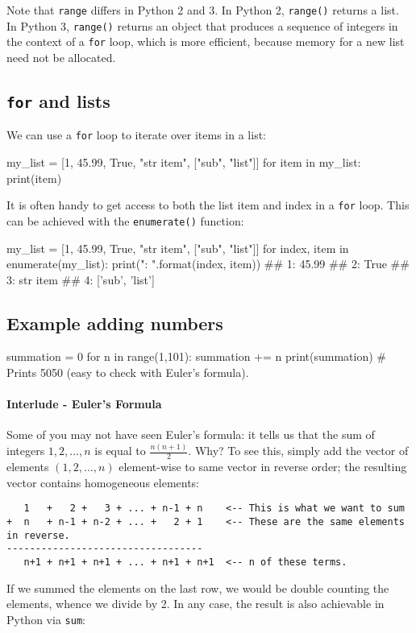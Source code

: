 \documentclass[12pt]{article} \newif\ifsolution\solutiontrue %
\begin{document}
Note that \texttt{range} differs in Python 2 and 3. In Python 2,
\texttt{range()} returns a list. In Python 3, \texttt{range()} returns
an object that produces a sequence of integers in the context of a
\texttt{for} loop, which is more efficient, because memory for a new
list need not be allocated.

\subsection{\texorpdfstring{\texttt{for} and
lists}{for and lists}}\label{for-and-lists}

We can use a \texttt{for} loop to iterate over items in a list:

\begin{python}
my_list = [1, 45.99, True, "str item", ["sub", "list"]]
for item in my_list:
    print(item)
\end{python}

It is often handy to get access to both the list item and index in a
\texttt{for} loop. This can be achieved with the \texttt{enumerate()}
function:

\begin{python}
my_list = [1, 45.99, True, "str item", ["sub", "list"]]
for index, item in enumerate(my_list):
    print("{}: {}".format(index, item))
## 1: 45.99
## 2: True
## 3: str item
## 4: ['sub', 'list']
\end{python}

\subsection{Example adding numbers}\label{example-adding-numbers}

\begin{python}
summation = 0
for n in range(1,101):
    summation += n
print(summation)  # Prints 5050 (easy to check with Euler's formula).
\end{python}

\paragraph{Interlude - Euler's Formula}
Some of you may not have seen Euler's formula: it tells us that the sum of integers ${1, 2, ..., n}$ is equal to $\frac{n (n+1)}{2}$. Why? To see this, simply add the vector of elements $(1, 2, \ldots, n)$ element-wise to same vector in reverse order; the resulting vector contains homogeneous elements:
\begin{verbatim}
   1   +   2 +   3 + ... + n-1 + n    <-- This is what we want to sum
+  n   + n-1 + n-2 + ... +   2 + 1    <-- These are the same elements in reverse.
----------------------------------
   n+1 + n+1 + n+1 + ... + n+1 + n+1  <-- n of these terms.
\end{verbatim}
If we summed the elements on the last row, we would be double counting the elements, whence we divide by 2.
In any case, the result is also achievable in Python via
\texttt{sum}:
\end{document}
